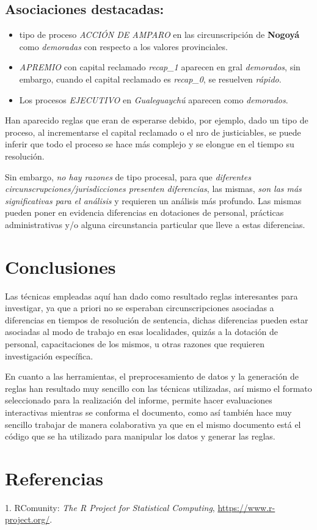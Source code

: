 \documentclass[runningheads,a4paper]{llncs}
\def\tightlist{} %
\begin{document}
\subsection{Asociaciones destacadas:}\label{asociaciones-destacadas}

\begin{itemize}
\tightlist
\item
  tipo de proceso \emph{ACCIÓN DE AMPARO} en las circunscripción de
  \textbf{Nogoyá} como \emph{demoradas} con respecto a los valores
  provinciales.
\item
  \emph{APREMIO} con capital reclamado \emph{recap\_1} aparecen en gral
  \emph{demorados}, sin embargo, cuando el capital reclamado es
  \emph{recap\_0}, se resuelven \emph{rápido}.
\item
  Los procesos \emph{EJECUTIVO} en \emph{Gualeguaychú} aparecen como
  \emph{demorados}.
\end{itemize}

Han aparecido reglas que eran de esperarse debido, por ejemplo, dado un
tipo de proceso, al incrementarse el capital reclamado o el nro de
justiciables, se puede inferir que todo el proceso se hace más complejo
y se elongue en el tiempo su resolución.

Sin embargo, \emph{no hay razones} de tipo procesal, para que
\emph{diferentes circunscrupciones/jurisdicciones presenten
diferencias}, las mismas, \emph{son las más significativas para el
análisis} y requieren un análisis más profundo. Las mismas pueden poner
en evidencia diferencias en dotaciones de personal, prácticas
administrativas y/o alguna circunstancia particular que lleve a estas
diferencias.

\section{Conclusiones}\label{conclusiones}

Las técnicas empleadas aquí han dado como resultado reglas interesantes
para investigar, ya que a priori no se esperaban circunscripciones
asociadas a diferencias en tiempos de resolución de sentencia, dichas
diferencias pueden estar asociadas al modo de trabajo en esas
localidades, quizás a la dotación de personal, capacitaciones de los
mismos, u otras razones que requieren investigación específica.

En cuanto a las herramientas, el preprocesamiento de datos y la
generación de reglas han resultado muy sencillo con las técnicas
utilizadas, así mismo el formato seleccionado para la realización del
informe, permite hacer evaluaciones interactivas mientras se conforma el
documento, como así también hace muy sencillo trabajar de manera
colaborativa ya que en el mismo documento está el código que se ha
utilizado para manipular los datos y generar las reglas.

\section*{Referencias}\label{referencias}

\hypertarget{refs}{}
\hypertarget{ref-RProject}{}
1. RComunity: \emph{The R Project for Statistical Computing},
\url{https://www.r-project.org/}.
\end{document}

